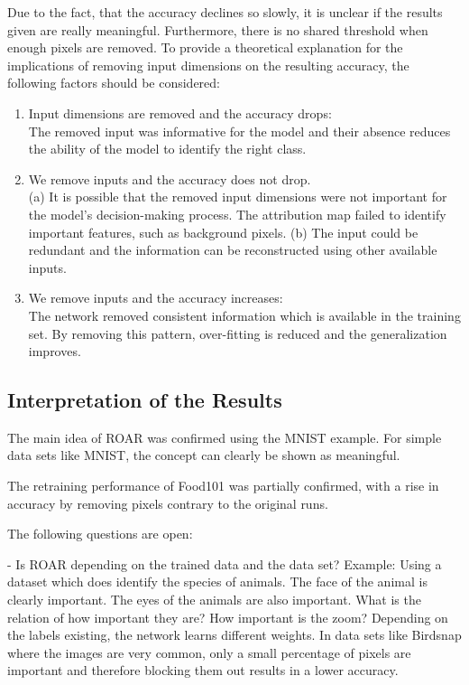 Due to the fact, that the accuracy declines so slowly, it is unclear if the results given are really meaningful. Furthermore, there is no shared threshold when enough pixels are removed.
To provide a theoretical explanation for the implications of removing input dimensions on the resulting accuracy, the following factors should be considered:

\begin{enumerate}
	\item Input dimensions are removed and the accuracy drops:\\ The removed input was informative for the model and
	their absence reduces the ability of the model to identify the right class.
	
	\item We remove inputs and the accuracy does not drop.\\ (a) It is possible that the removed input dimensions	were not important for the model’s decision-making	process. The attribution map failed to identify important features, such as background pixels. (b) The input could be redundant and the information can be reconstructed using other available inputs. 
	
	\item We remove inputs and the accuracy increases:\\ The network removed consistent information which is available in the training set. By removing this pattern, over-fitting is reduced and the generalization improves.
\end{enumerate}


\subsection{Interpretation of the Results}

The main idea of ROAR was confirmed using the MNIST example. For simple data sets like MNIST, the concept can clearly be shown as meaningful.

The retraining performance of Food101 was partially confirmed, with a rise in accuracy by removing pixels contrary to the original runs.

The following questions are open:

- Is ROAR depending on the trained data and the data set? Example: Using a dataset which does identify the species of animals. The face of the animal is clearly important. The eyes of the animals are also important. What is the relation of how important they are? How important is the zoom? Depending on the labels existing, the network learns different weights. In data sets like Birdsnap where the images are very common, only a small percentage of pixels are important and therefore blocking them out results in a lower accuracy.


